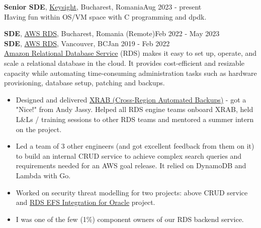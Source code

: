 \documentclass[line, margin]{resume}
\begin{document}
\begin{resume}
\textbf{Senior SDE}, \href{https://www.keysight.com/}{Keysight}, Bucharest, Romania\hfill Aug 2023 - present\\
Having fun within OS/VM space with C programming and dpdk.

\textbf{SDE}, \href{https://aws.amazon.com/}{AWS RDS}, Bucharest, Romania (Remote)\hfill Feb 2022 - May 2023\\
\textbf{SDE}, \href{https://aws.amazon.com/}{AWS RDS}, Vancouver, BC\hfill Jan 2019 - Feb 2022 \\
\href{https://aws.amazon.com/rds/}{Amazon Relational Database Service} (RDS) makes it easy to set up, operate, and scale a relational database in the cloud. It provides cost-efficient and resizable capacity while automating time-consuming administration tasks such as hardware provisioning, database setup, patching and backups.
\begin{itemize} \itemsep -2pt  %
    \item Designed and delivered \href{https://docs.aws.amazon.com/AmazonRDS/latest/UserGuide/USER_ReplicateBackups.html}{XRAB (Cross-Region Automated Backups)} - got a "Nice!" from Andy Jassy. Helped all RDS engine teams onboard XRAB, held L\&Ls / training sessions to other RDS teams and mentored a summer intern on the project.
    \item Led a team of 3 other engineers (and got excellent feedback from them on it) to build an internal CRUD service to achieve complex search queries and requirements needed for an AWS goal release. It relied on DynamoDB and Lambda with Go.
    \item Worked on security threat modelling for two projects: above CRUD service and \href{https://docs.aws.amazon.com/AmazonRDS/latest/UserGuide/oracle-efs-integration.html}{RDS EFS Integration for Oracle} project.
    \item I was one of the few (1\%) component owners of our RDS backend service. %
\end{itemize}



\end{resume}
\end{document}
